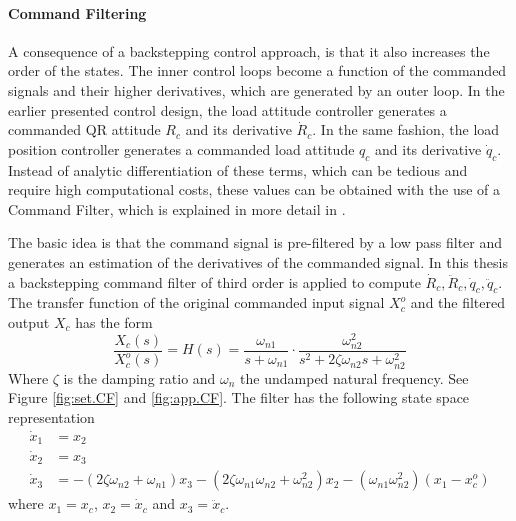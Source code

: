 \paragraph{Command Filtering}
A consequence of a backstepping control approach, is that it also increases the order of the states. The inner control loops become a function of the commanded signals and their higher derivatives, which are generated by an outer loop.
In the earlier presented control design, the load attitude controller generates a commanded QR attitude $ R_c $ and its derivative $ \dot{R}_c $. In the same fashion, the load position controller generates a commanded load attitude $ q_c $ and its derivative $ \dot{q}_c $. 
Instead of analytic differentiation of these terms, which can be tedious and require high computational costs, these values can be obtained with the use of a Command Filter, which is explained in more detail in \cite{Farrell2008}. 

The basic idea is that the command signal is pre-filtered by a low pass filter and generates an estimation of the derivatives of the commanded signal. 
In this thesis a backstepping command filter of third order is applied to compute $ \dot{R}_c, \ddot{R}_c,\dot{q}_c, \ddot{q}_c $. 
The transfer function of the original commanded input signal $ X_c^o $ and the filtered output $ X_c $ has the form
\begin{equation}\label{key}
\frac{X_c(s)}{X_c^o(s)}=H(s)=\frac{\omega_{n1}}{s+\omega_{n1}}\cdot\frac{\omega_{n2}^2}{s^2+2\zeta\omega_{n2}s+\omega_{n2}^2}
\end{equation}
Where $ \zeta $ is the damping ratio and $ \omega_n $ the undamped natural frequency. See Figure \ref{fig:set.CF} and \ref{fig:app.CF}.
The filter has the following state space representation
\begin{align}\label{key}
\dot{x}_1 &= x_2\\ %
\dot{x}_2 &= x_3\\ %
\dot{x}_3 &= -(2\zeta \omega_{n2}+\omega_{n1})x_3-(2\zeta\omega_{n1}\omega_{n2}+\omega_{n2}^2)x_2-(\omega_{n1}\omega_{n2}^2)(x_1-x_c^o)
\end{align}
where $ x_1 = x_c$, $ x_2 = \dot{x}_c$ and $ x_3 = \ddot{x}_c$. 

